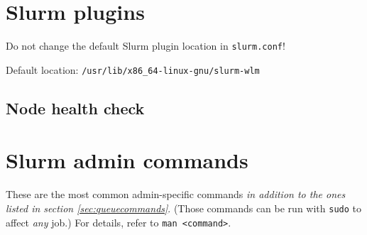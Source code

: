 %
%
%
%
%
%

\section{Slurm plugins} \label{sec:slurmplugins}

Do not change the default Slurm plugin location in \texttt{slurm.conf}!

Default location: \texttt{/usr/lib/x86\_64-linux-gnu/slurm-wlm}

\subsection{Node health check}

\section{Slurm admin commands} \label{sec:slurmadmin}
These are the most common admin-specific commands \emph{in addition to the ones listed in section \ref{sec:queuecommands}}. (Those commands can be run with \texttt{sudo} to affect \emph{any} job.) For details, refer to \texttt{man <command>}.

